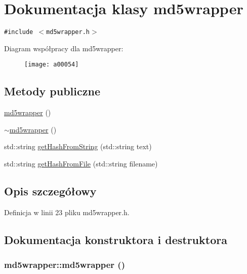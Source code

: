 \hypertarget{a00004}{
\section{Dokumentacja klasy md5wrapper}
\label{a00004}
}
{\tt \#include $<$md5wrapper.h$>$}

Diagram współpracy dla md5wrapper:\nopagebreak
\begin{figure}[H]
\begin{center}
\leavevmode
\texttt{[image: a00054]}
\end{center}
\end{figure}
\subsection*{Metody publiczne}
\begin{CompactItemize}
\item 
\hyperlink{a00004_ae8138b76b89d93a4c21077b76d57c07}{md5wrapper} ()
\item 
\hyperlink{a00004_65e78258ad508d83be81d395f8bd43f4}{$\sim$md5wrapper} ()
\item 
std::string \hyperlink{a00004_225ba5a78228b867c3f17fdba959d8e6}{getHashFromString} (std::string text)
\item 
std::string \hyperlink{a00004_e6cd2a7928b997c5d6388ae81a0d841a}{getHashFromFile} (std::string filename)
\end{CompactItemize}


\subsection{Opis szczegółowy}


Definicja w linii 23 pliku md5wrapper.h.

\subsection{Dokumentacja konstruktora i destruktora}
\hypertarget{a00004_ae8138b76b89d93a4c21077b76d57c07}{
\subsubsection[{md5wrapper}]{\setlength{\rightskip}{0pt plus 5cm}md5wrapper::md5wrapper ()}}
\label{a00004_ae8138b76b89d93a4c21077b76d57c07}




